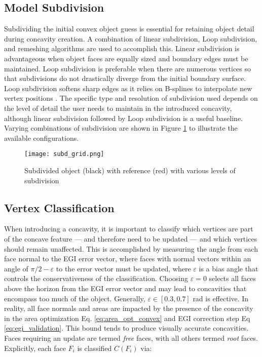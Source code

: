 \subsection{Model Subdivision}

Subdividing the initial convex object guess is essential for retaining object detail during concavity creation. A combination of linear subdivision, Loop subdivision, and remeshing algorithms are used to accomplish this. Linear subdivision is advantageous when object faces are equally sized and boundary edges must be maintained. Loop subdivision is preferable when there are numerous vertices so that subdivisions do not drastically diverge from the initial boundary surface. Loop subdivision softens sharp edges as it relies on B-splines to interpolate new vertex positions \cite{loop1987}. The specific type and resolution of subdivision used depends on the level of detail the user needs to maintain in the introduced concavity, although linear subdivision followed by Loop subdivision is a useful baseline. Varying combinations of subdivision are shown in Figure \ref{fig:subd_grid} to illustrate the available configurations.

\graphicspath{{/Users/liamrobinson/Documents/msthesis/static_images/aas_2022_figs}}
\begin{figure}[!htb]
  \centering
  \texttt{[image: subd\_grid.png]}
  \caption{Subdivided object (black) with reference (red) with various levels of subdivision}
  \label{fig:subd_grid}
\end{figure}

\subsection{Vertex Classification}

When introducing a concavity, it is important to classify which vertices are part of the concave feature --- and therefore need to be updated --- and which vertices should remain unaffected. This is accomplished by measuring the angle from each face normal to the EGI error vector, where faces with normal vectors within an angle of $\pi/2 - \varepsilon$ to the error vector must be updated, where $\varepsilon$ is a bias angle that controls the conservativeness of the classification. Choosing $\varepsilon=0$ selects all faces above the horizon from the EGI error vector and may lead to concavities that encompass too much of the object. Generally, $\varepsilon \in [0.3, 0.7]$ rad is effective. In reality, all face normals and areas are impacted by the presence of the concavity in the area optimization Eq. \ref{eq:area_opt_convex} and EGI correction step Eq \ref{eq:egi_validation}. This bound tends to produce visually accurate concavities. Faces requiring an update are termed \textit{free} faces, with all others termed \textit{root} faces. Explicitly, each face $F_i$ is classified $C(F_i)$ via:

